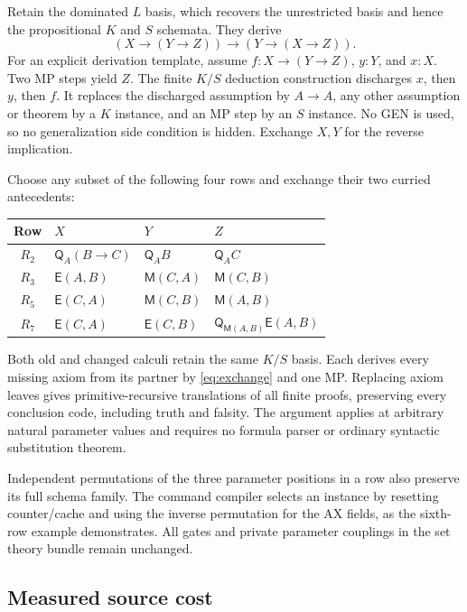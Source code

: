 \documentclass[11pt,a4paper]{article}
\theoremstyle{definition}
\newcommand{\qnt}{\mathsf Q}
\newcommand{\mem}{\mathsf M}
\newcommand{\eqn}{\mathsf E}
\numberwithin{equation}{section}
\begin{document}
Retain the dominated $L$ basis, which recovers the unrestricted basis
and hence the propositional $K$ and $S$ schemata. They derive
\begin{equation}
 (X\to(Y\to Z))\to(Y\to(X\to Z)).
 \label{eq:exchange}
\end{equation}
For an explicit derivation template, assume $f:X\to(Y\to Z)$,
$y:Y$, and $x:X$. Two MP steps yield $Z$. The finite $K/S$ deduction
construction discharges $x$, then $y$, then $f$. It replaces the
discharged assumption by $A\to A$, any other assumption or theorem
by a $K$ instance, and an MP step by an $S$ instance. No GEN is used,
so no generalization side condition is hidden. Exchange $X,Y$ for the
reverse implication.

Choose any subset of the following four rows and exchange their two
curried antecedents:
\begin{center}
\small
\begin{tabular}{clll}
\toprule
Row & $X$ & $Y$ & $Z$\\
\midrule
$R_2$ & $\qnt_A(B\to C)$ & $\qnt_A B$ & $\qnt_A C$\\
$R_3$ & $\eqn(A,B)$ & $\mem(C,A)$ & $\mem(C,B)$\\
$R_5$ & $\eqn(C,A)$ & $\mem(C,B)$ & $\mem(A,B)$\\
$R_7$ & $\eqn(C,A)$ & $\eqn(C,B)$ & $\qnt_{\mem(A,B)}\eqn(A,B)$\\
\bottomrule
\end{tabular}
\end{center}
Both old and changed calculi retain the same $K/S$ basis. Each derives
every missing axiom from its partner by \eqref{eq:exchange} and one MP.
Replacing axiom leaves gives primitive-recursive translations of all
finite proofs, preserving every conclusion code, including truth and
falsity. The argument applies at arbitrary natural parameter values and
requires no formula parser or ordinary syntactic substitution theorem.

Independent permutations of the three parameter positions in a row
also preserve its full schema family. The command compiler selects an
instance by resetting counter/cache and using the inverse permutation
for the AX fields, as the sixth-row example demonstrates. All gates
and private parameter couplings in the set theory bundle remain unchanged.

\subsection{Measured source cost}
\end{document}
